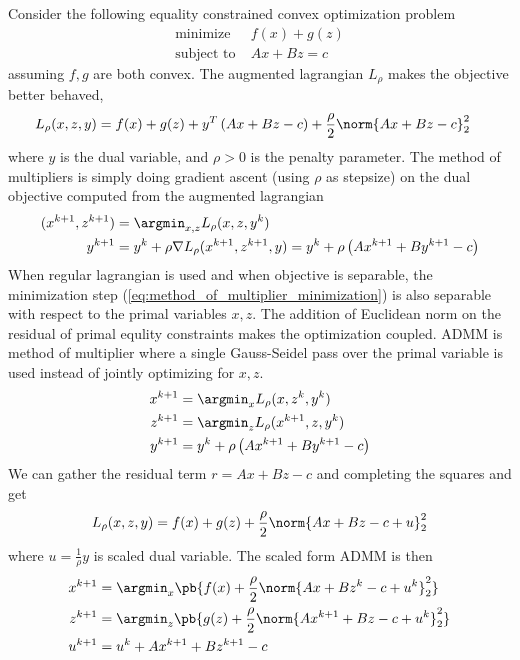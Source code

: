 \documentclass[../writeup.tex]{subfiles}
\begin{document}
Consider the following equality constrained convex optimization problem 
\begin{align}
    \text{minimize}\;
        &f(x) + g(z) \\
    \text{subject to}\;
        &Ax+Bz=c
    \label{eq:admm_objective}
\end{align}
assuming $f,g$ are both convex. The augmented lagrangian $L_{\rho}$ makes the objective better behaved,
\begin{align}
    L_{\rho}(x,z,y)
        &= f(x) + g(z) + y^T\left(Ax + Bz - c\right) + \frac{\rho}{2} \norm{Ax+Bz-c}_2^2
\end{align}
where $y$ is the dual variable, and $\rho>0$ is the penalty parameter. The method of multipliers is simply doing gradient ascent (using $\rho$ as stepsize) on the dual objective computed from the augmented lagrangian
\begin{align}
    (x^{k+1},z^{k+1})
        &= \argmin_{x,z} L_{\rho}(x,z,y^{k}) 
        \label{eq:method_of_multiplier_minimization} \\
    y^{k+1}
        &= y^k + \rho \nabla L_{\rho}(x^{k+1},z^{k+1},y)
        = y^k + \rho \left( Ax^{k+1} + By^{k+1} - c \right)
        \label{eq:method_of_multiplier_dual_update}
\end{align}
When regular lagrangian is used and when objective is separable, the minimization step (\ref{eq:method_of_multiplier_minimization}) is also separable with respect to the primal variables $x,z$. The addition of Euclidean norm on the residual of primal equlity constraints makes the optimization coupled. ADMM is method of multiplier where a single Gauss-Seidel pass over the primal variable is used instead of jointly optimizing for $x,z$.
\begin{align}
    x^{k+1}
        &= \argmin_{x} L_{\rho}(x,z^k,y^k) 
        \nonumber \\
    z^{k+1}
        &= \argmin_{z} L_{\rho}(x^{k+1},z,y^k) 
        \nonumber \\
    y^{k+1}
        &= y^k + \rho \left( Ax^{k+1} + By^{k+1} - c \right)
        \label{eq:admm_iterates_dual_update}
\end{align}
We can gather the residual term $r=Ax+Bz-c$ and completing the squares and get
\begin{align}
    L_{\rho}(x,z,y)
        = f(x) + g(z) + \frac{\rho}{2} \norm{Ax + Bz - c + u}_2^2
    \label{eq:admm_scaled_augmented_lagrangian}
\end{align}
where $u=\frac{1}{\rho}y$ is scaled dual variable. The scaled form ADMM is then
\begin{align}
    x^{k+1}
        &= \argmin_x \pb{
            f(x) + \frac{\rho}{2} \norm{Ax+Bz^k-c+u^k}_2^2 
        } 
        \nonumber \\
    z^{k+1}
        &= \argmin_z \pb{
            g(z) + \frac{\rho}{2} \norm{Ax^{k+1}+Bz-c+u^k}_2^2
        } 
        \nonumber \\
    u^{k+1}
        &= u^k + Ax^{k+1} + Bz^{k+1} - c
    \label{eq:admm_scaled_form}
\end{align}
\end{document}
